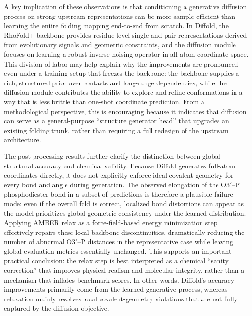 A key implication of these observations is that conditioning a generative diffusion process on strong upstream representations can be more sample-efficient than learning the entire folding mapping end-to-end from scratch. In Diffold, the RhoFold+ backbone provides residue-level single and pair representations derived from evolutionary signals and geometric constraints, and the diffusion module focuses on learning a robust inverse-noising operator in all-atom coordinate space. This division of labor may help explain why the improvements are pronounced even under a training setup that freezes the backbone: the backbone supplies a rich, structured prior over contacts and long-range dependencies, while the diffusion module contributes the ability to explore and refine conformations in a way that is less brittle than one-shot coordinate prediction. From a methodological perspective, this is encouraging because it indicates that diffusion can serve as a general-purpose “structure generator head” that upgrades an existing folding trunk, rather than requiring a full redesign of the upstream architecture.

The post-processing results further clarify the distinction between global structural accuracy and chemical validity. Because Diffold generates full-atom coordinates directly, it does not explicitly enforce ideal covalent geometry for every bond and angle during generation. The observed elongation of the $\text{O3}'–\text{P}$ phosphodiester bond in a subset of predictions is therefore a plausible failure mode: even if the overall fold is correct, localized bond distortions can appear as the model prioritizes global geometric consistency under the learned distribution. Applying AMBER relax as a force-field-based energy minimization step effectively repairs these local backbone discontinuities, dramatically reducing the number of abnormal $\text{O3}'–\text{P}$ distances in the representative case while leaving global evaluation metrics essentially unchanged. This supports an important practical conclusion: the relax step is best interpreted as a chemical “sanity correction” that improves physical realism and molecular integrity, rather than a mechanism that inflates benchmark scores. In other words, Diffold’s accuracy improvements primarily come from the learned generative process, whereas relaxation mainly resolves local covalent-geometry violations that are not fully captured by the diffusion objective.


